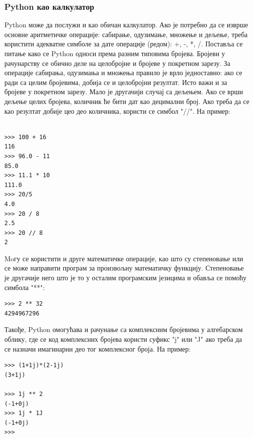 \documentclass[11pt, serbianc, english, titlepage]{article}
\begin{document}
		\subsubsection{Python као калкулатор}
		Python може да послужи и као обичан калкулатор\cite{van2003introduction,lutz2009learning}. Ако је потребно да се изврше основне аритметичке операције: сабирање, одузимање, множење и дељење, треба користити адекватне симболе за дате операције (редом): +, -, *, /. Поставља се питање како се Python односи према разним типовима бројева. Бројеви у рачунарству се обично деле на целобројне и бројеве у покретном зарезу. За операције сабирања, одузимања и множења правило је врло једноставно: ако се ради са целим бројевима, добија се и целобројни резултат. Исто важи и за бројеве у покретном зарезу. Мало је другачији случај са дељењем. Ако се врши дељење целих бројева, количник ће бити дат као децимални број. Ако треба да се као резултат добије цео део количника, користи се симбол "//". На пример:
\begin{lstlisting}[caption = Примери операција са бројевима, label = racun]

>>> 100 + 16
116
>>> 96.0 - 11
85.0
>>> 11.1 * 10
111.0
>>> 20/5
4.0
>>> 20 / 8
2.5
>>> 20 // 8
2
\end{lstlisting}
Moгу се користити и друге математичке операције, као што су степеновање или се може направити програм за произвољну математичку функцију. Степеновање је другачије него што је то у осталим програмским језицима и обавља се помоћу симбола "**":
\begin{lstlisting}[caption = Степеновање, label = stepen]
>>> 2 ** 32
4294967296
\end{lstlisting}
Такође, Python омогућава и рачунање са комплексним бројевима у алгебарском облику, где се код комплексних бројева користи суфикс "j" или "J" ако треба да се назначи имагинарни део тог комплексног броја. На пример:
\begin{lstlisting}[caption = Операције са комплексним бројевима, label = kompleksni]
>>> (1+1j)*(2-1j)
(3+1j)

>>> 1j ** 2
(-1+0j)
>>> 1j * 1J
(-1+0j)
>>> 
\end{lstlisting}
\end{document}
